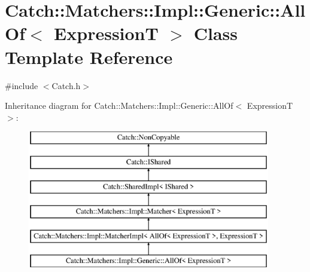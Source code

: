 \hypertarget{class_catch_1_1_matchers_1_1_impl_1_1_generic_1_1_all_of}{}\section{Catch\+:\+:Matchers\+:\+:Impl\+:\+:Generic\+:\+:All\+Of$<$ ExpressionT $>$ Class Template Reference}
\label{class_catch_1_1_matchers_1_1_impl_1_1_generic_1_1_all_of}


{\ttfamily \#include $<$Catch.\+h$>$}

Inheritance diagram for Catch\+:\+:Matchers\+:\+:Impl\+:\+:Generic\+:\+:All\+Of$<$ ExpressionT $>$\+:\begin{figure}[H]
\begin{center}
\leavevmode
\includegraphics[height=6.000000cm]{class_catch_1_1_matchers_1_1_impl_1_1_generic_1_1_all_of}
\end{center}
\end{figure}
